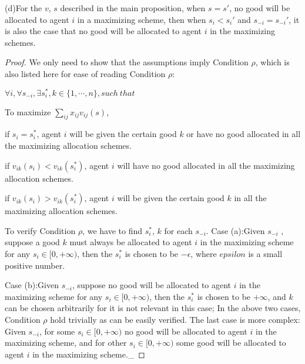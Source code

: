 \begin{lemma*}
  (d)For the $v$, $s$ described in the main proposition, when $s= s'$, no good will be allocated to agent $i$ in a maximizing scheme, then when $s_i < s_i'$ and $s_{-i}=s_{-i}'$, it is also the case that no good will be allocated to agent $i$ in the maximizing schemes. 
\end{lemma*}



  


\begin{proof}
  We only need to show that the assumptions imply Condition $\rho$, which is also listed here for ease of reading
  Condition $\rho$:

$\forall i,\forall s_{-i}, \exists s_i^* ,k \in \{1,\cdots,n\}, such\ that $

To maximize  $\sum_{ij}x_{ij}v_{ij}(s)$,

if $s_i = s_i^*$, agent $i$ will be given the certain good $k$ or have no good allocated in all the maximizing allocation schemes.

if $v_{ik}(s_i) < v_{ik}(s_i^*)$, agent $i$ will have no good allocated in all the maximizing allocation schemes.

if $v_{ik}(s_i) > v_{ik}(s_i^*)$, agent $i$ will be given the certain good $k$ in all the maximizing allocation schemes.

To verify Condition $\rho$, we have to find $s_i^*$, $k$ for each $s_{-i}$.
Case (a):Given $s_{-i}$ , suppose a good $k$ must always be allocated to agent $i$ in the maximizing scheme for any $s_i \in [0,+\infty)$,  then the $s_i^*$ is chosen to be $-\epsilon$, where $epsilon$ is a small positive number.%

Case (b):Given $s_{-i} $, suppose no good will be allocated to agent $i$ in the maximizing scheme for any $s_i \in [0,+\infty)$, then the $s_i^*$ is chosen to be $+\infty$, and $k$ can be chosen arbitrarily for it is not relevant in this case;
In the above two cases, Condition $\rho$ hold trivially as can be easily verified. The last case is more complex:
Given $s_{-i}$, for some $s_i \in [0,+\infty)$ no good will be allocated to agent $i$ in the maximizing scheme, and for other $s_i \in [0,+\infty)$ some good will be allocated to agent $i$ in the maximizing scheme._

 


\end{proof}